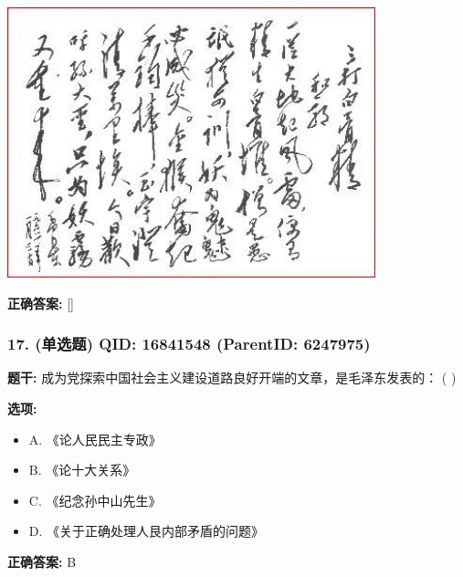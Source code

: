 \documentclass[12pt,UTF8]{ctexart}
\begin{document}
\begin{center}\includegraphics[width=0.8\textwidth,keepaspectratio]{chapter_2551632_专题四_社会主义改造理论/unit_6247975_练习题二/question_16841953/title_img_2.png}\end{center}



\textbf{正确答案:}
[]

\vspace{0.3em}\hrulefill\vspace{0.7em}

\subsubsection*{17. (单选题) \small QID: 16841548 (ParentID: 6247975)}

\textbf{题干:}
成为党探索中国社会主义建设道路良好开端的文章，是毛泽东发表的： ( )



\textbf{选项:}
\begin{itemize}[leftmargin=*]

  \item A. 《论人民民主专政》

  \item B. 《论十大关系》

  \item C. 《纪念孙中山先生》

  \item D. 《关于正确处理人艮内部矛盾的问题》

\end{itemize}

\textbf{正确答案:}
B

\vspace{0.3em}\hrulefill\vspace{0.7em}
\end{document}
